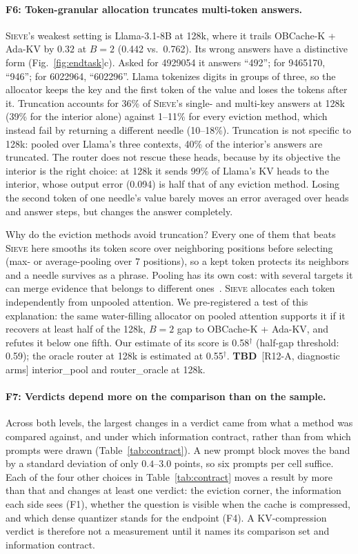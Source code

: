 \documentclass{article}
\newcommand{\tbd}[1]{{\color{tbdcol}\textbf{TBD}~#1}}
\newcommand{\est}[1]{{\color{estcol}#1$^{\dagger}$}}
\newcommand{\sieve}{\textsc{Sieve}}
\theoremstyle{definition}
\begin{document}
\paragraph{F6: Token-granular allocation truncates multi-token answers.}
\sieve{}'s weakest setting is Llama-3.1-8B at 128k, where it trails OBCache-K + Ada-KV by $0.32$ at $B=2$ (0.442 vs.\ 0.762).  Its wrong answers have a distinctive form (Fig.~\ref{fig:endtask}c).  Asked for 4929054 it answers ``492''; for 9465170, ``946''; for 6022964, ``602296''.  Llama tokenizes digits in groups of three, so the allocator keeps the key and the first token of the value and loses the tokens after it.  Truncation accounts for 36\% of \sieve{}'s single- and multi-key answers at 128k (39\% for the interior alone) against 1--11\% for every eviction method, which instead fail by returning a different needle (10--18\%).  Truncation is not specific to 128k: pooled over Llama's three contexts, 40\% of the interior's answers are truncated.  The router does not rescue these heads, because by its objective the interior is the right choice: at 128k it sends 99\% of Llama's KV heads to the interior, whose output error (0.094) is half that of any eviction method.  Losing the second token of one needle's value barely moves an error averaged over heads and answer steps, but changes the answer completely.

Why do the eviction methods avoid truncation?  Every one of them that beats \sieve{} here smooths its token score over neighboring positions before selecting (max- or average-pooling over 7 positions), so a kept token protects its neighbors and a needle survives as a phrase.  Pooling has its own cost: with several targets it can merge evidence that belongs to different ones~\citep{zhang2026fixedcontract}.  \sieve{} allocates each token independently from unpooled attention.  We pre-registered a test of this explanation: the same water-filling allocator on pooled attention supports it if it recovers at least half of the 128k, $B=2$ gap to OBCache-K + Ada-KV, and refutes it below one fifth.  Our estimate of its score is \est{0.58} (half-gap threshold: 0.59); the oracle router at 128k is estimated at \est{0.55}.  \tbd{[R12-A, diagnostic arms] interior\_pool and router\_oracle at 128k.}

\paragraph{F7: Verdicts depend more on the comparison than on the sample.}
Across both levels, the largest changes in a verdict came from what a method was compared against, and under which information contract, rather than from which prompts were drawn (Table~\ref{tab:contract}).  A new prompt block moves the band by a standard deviation of only $0.4$--$3.0$ points, so six prompts per cell suffice.  Each of the four other choices in Table~\ref{tab:contract} moves a result by more than that and changes at least one verdict: the eviction corner, the information each side sees (F1), whether the question is visible when the cache is compressed, and which dense quantizer stands for the endpoint (F4).  A KV-compression verdict is therefore not a measurement until it names its comparison set and information contract.
\end{document}
